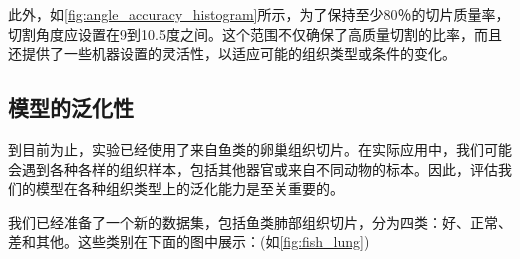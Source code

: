 此外，如\autoref{fig:angle_accuracy_histogram}所示，为了保持至少80％的切片质量率，切割角度应设置在9到10.5度之间。这个范围不仅确保了高质量切割的比率，而且还提供了一些机器设置的灵活性，以适应可能的组织类型或条件的变化。

\subsection{模型的泛化性}

到目前为止，实验已经使用了来自鱼类的卵巢组织切片。在实际应用中，我们可能会遇到各种各样的组织样本，包括其他器官或来自不同动物的标本。因此，评估我们的模型在各种组织类型上的泛化能力是至关重要的。

我们已经准备了一个新的数据集，包括鱼类肺部组织切片，分为四类：好、正常、差和其他。这些类别在下面的图中展示：(如\autoref{fig:fish_lung})

